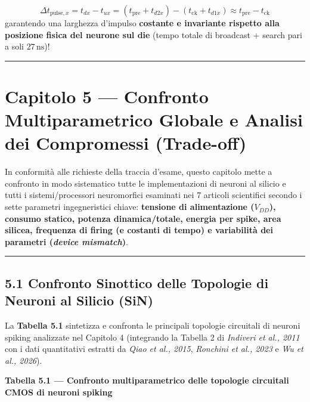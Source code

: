 \documentclass[11pt,a4paper]{article}
\begin{document}
\[
\Delta t_{\text{pulse},x} = t_{dx} - t_{ux} = \left(t_{\text{pre}} + t_{d2x}\right) - \left(t_{\text{ck}} + t_{d1x}\right) \approx t_{\text{pre}} - t_{\text{ck}}
\]
garantendo una larghezza d'impulso \textbf{costante e invariante rispetto alla posizione fisica del neurone sul die} (tempo totale di broadcast + search pari a soli \textbf{$27\,\text{ns}$})!


\bigskip\hrule\bigskip

\section{Capitolo 5 --- Confronto Multiparametrico Globale e Analisi dei Compromessi (Trade-off)}

In conformità alle richieste della traccia d'esame, questo capitolo mette a confronto in modo sistematico tutte le implementazioni di neuroni al silicio e tutti i sistemi/processori neuromorfici esaminati nei 7 articoli scientifici secondo i sette parametri ingegneristici chiave: \textbf{tensione di alimentazione ($V_{DD}$), consumo statico, potenza dinamica/totale, energia per spike, area silicea, frequenza di firing (e costanti di tempo) e variabilità dei parametri (\textit{device mismatch})}.

\bigskip\hrule\bigskip

\subsection{5.1 Confronto Sinottico delle Topologie di Neuroni al Silicio (SiN)}

La \textbf{Tabella 5.1} sintetizza e confronta le principali topologie circuitali di neuroni spiking analizzate nel Capitolo 4 (integrando la Tabella 2 di \textit{Indiveri et al., 2011} con i dati quantitativi estratti da \textit{Qiao et al., 2015}, \textit{Ronchini et al., 2023} e \textit{Wu et al., 2026}).

\textbf{Tabella 5.1 --- Confronto multiparametrico delle topologie circuitali CMOS di neuroni spiking}
\end{document}
